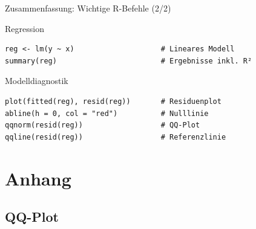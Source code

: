 \documentclass[aspectratio=169,11pt]{beamer}
\begin{document}
\begin{frame}[fragile]{Zusammenfassung: Wichtige R-Befehle (2/2)}
  \begin{block}{Regression}
    \begin{lstlisting}
reg <- lm(y ~ x)                    # Lineares Modell
summary(reg)                        # Ergebnisse inkl. R²
\end{lstlisting}
  \end{block}

  \vspace{0.3cm}

  \begin{block}{Modelldiagnostik}
    \begin{lstlisting}
plot(fitted(reg), resid(reg))       # Residuenplot
abline(h = 0, col = "red")          # Nulllinie
qqnorm(resid(reg))                  # QQ-Plot
qqline(resid(reg))                  # Referenzlinie
\end{lstlisting}
  \end{block}
\end{frame}

\appendix
\section{Anhang}

\subsection{QQ-Plot}
\end{document}
